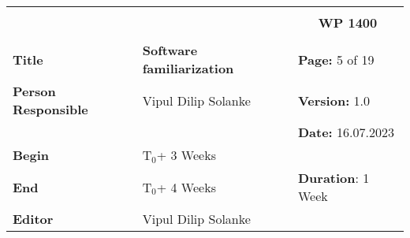\begin{table}[!h]
  \begin{center}
    \begin{tabular}{|p{35mm}||p{55mm}|p{50mm}||p{40mm}|}
      \hline
      \multicolumn{3}{|l||}{\textbf{}} & \multicolumn{1}{c|}{}                                                                                                                                                \\
      \multicolumn{3}{|l||}{\textbf{}} & \multicolumn{1}{c|}{\textbf{WP 1400}}                                                                                                                                \\
      \multicolumn{3}{|l||}{\textbf{}} & \multicolumn{1}{c|}{}                                                                                                                                                \\
      \hline\hline
      \textbf{Title}                   & \multicolumn{2}{p{7cm}||}{\textbf{Software familiarization}}
                                       & \textbf{Page:} 5 of 19                                                                                                                                              \\
      \hline
      \textbf{Person Responsible}        & \multicolumn{2}{l||}{Vipul Dilip Solanke}                                                                                                   & \textbf{Version:} 1.0   \\
      \hline
      \multicolumn{3}{|l||}{}          & \textbf{Date:} 16.07.2023                                                                                                                                          \\
      \hline\hline
      \textbf{Begin}                  & \multicolumn{2}{l||}{T$_0$+ 3 Weeks}                                                                                                                &                         \\
      \hline
      \textbf{End}                    & \multicolumn{2}{l||}{T$_0$+ 4 Weeks}                                                                                                        & \textbf{Duration}: 1 Week \\
      \hline\hline
      \textbf{Editor}              & \multicolumn{3}{l|}{Vipul Dilip Solanke}                                                                                                                              \\

\end{tabular}
\end{center}
\end{table}
